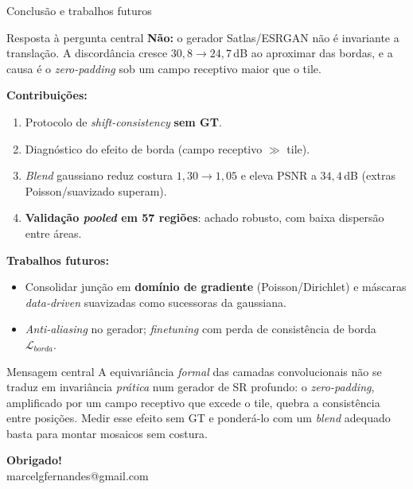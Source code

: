 \documentclass[aspectratio=169]{beamer}
\begin{document}
\begin{frame}{Conclusão e trabalhos futuros}

  \begin{block}{Resposta à pergunta central}
    \textbf{Não:} o gerador Satlas/ESRGAN não é invariante a translação. A discordância
    cresce $30{,}8\to24{,}7$\,dB ao aproximar das bordas, e a causa é o
    \textit{zero-padding} sob um campo receptivo maior que o tile.
  \end{block}

  \vspace{0.3em}
  \textbf{Contribuições:}
  \begin{enumerate}
    \item Protocolo de \textit{shift-consistency} \textbf{sem GT}.
    \item Diagnóstico do efeito de borda (campo receptivo $\gg$ tile).
    \item \textit{Blend} gaussiano reduz costura $1{,}30\to1{,}05$ e eleva PSNR a
          $34{,}4$\,dB (extras Poisson/suavizado superam).
    \item \textcolor{gain}{\textbf{Validação \emph{pooled} em 57 regiões}}: achado
          robusto, com baixa dispersão entre áreas.
  \end{enumerate}

  \vspace{0.3em}
  \textbf{Trabalhos futuros:}
  \begin{itemize}
    \item Consolidar junção em \textbf{domínio de gradiente} (Poisson/Dirichlet) e
          máscaras \textit{data-driven} suavizadas como sucessoras da gaussiana.
    \item \textit{Anti-aliasing} no gerador; \textit{finetuning} com perda de
          consistência de borda $\mathcal{L}_{borda}$.
  \end{itemize}

\end{frame}

\begin{frame}[plain]
  \begin{block}{Mensagem central}
    A equivariância \emph{formal} das camadas convolucionais não se traduz em
    invariância \emph{prática} num gerador de SR profundo: o \textit{zero-padding},
    amplificado por um campo receptivo que excede o tile, quebra a consistência entre
    posições. Medir esse efeito sem GT e ponderá-lo com um \textit{blend} adequado
    basta para montar mosaicos sem costura.
  \end{block}
  \vspace{3em}
  \begin{center}
    \Large\textbf{Obrigado!}\\[0.6em]
    \normalsize marcelgfernandes@gmail.com
  \end{center}
\end{frame}

\end{document}
